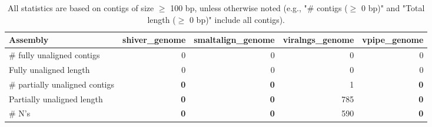 \documentclass[12pt,a4paper]{article}
\begin{document}
\begin{table}[ht]
\begin{center}
\caption{All statistics are based on contigs of size $\geq$ 100 bp, unless otherwise noted (e.g., "\# contigs ($\geq$ 0 bp)" and "Total length ($\geq$ 0 bp)" include all contigs).}
\begin{tabular}{|l*{4}{|r}|}
\hline
Assembly & shiver\_genome & smaltalign\_genome & viralngs\_genome & vpipe\_genome \\ \hline
\# fully unaligned contigs & 0 & 0 & 0 & 0 \\ \hline
Fully unaligned length & 0 & 0 & 0 & 0 \\ \hline
\# partially unaligned contigs & {\bf 0} & {\bf 0} & 1 & {\bf 0} \\ \hline
Partially unaligned length & {\bf 0} & {\bf 0} & 785 & {\bf 0} \\ \hline
\# N's & {\bf 0} & {\bf 0} & 590 & {\bf 0} \\ \hline
\end{tabular}
\end{center}
\end{table}
\end{document}
